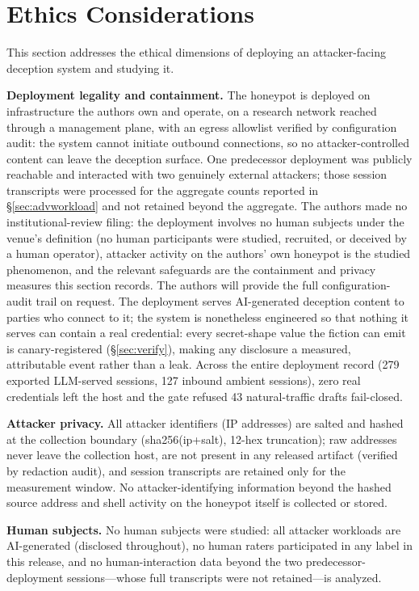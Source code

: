 \section{Ethics Considerations}
\label{sec:ethics}

This section addresses the ethical dimensions of deploying an
attacker-facing deception system and studying it.

\textbf{Deployment legality and containment.} The honeypot is deployed on
infrastructure the authors own and operate, on a research network reached
through a management plane, with an egress allowlist verified by
configuration audit: the system cannot initiate outbound connections, so
no attacker-controlled content can leave the deception surface. One
predecessor deployment was publicly reachable and interacted with two
genuinely external attackers; those session transcripts were processed
for the aggregate counts reported in \S\ref{sec:advworkload} and not
retained beyond the aggregate. The authors made no institutional-review
filing: the deployment involves no human subjects under the
venue's definition (no human participants were studied, recruited, or
deceived by a human operator), attacker activity on the authors' own
honeypot is the studied phenomenon, and the relevant safeguards are the
containment and privacy measures this section records. The authors will
provide the full configuration-audit trail on request. The
deployment serves AI-generated deception content to parties who connect
to it; the system is nonetheless engineered so that nothing it serves can
contain a real credential: every secret-shape value the fiction can emit
is canary-registered (\S\ref{sec:verify}), making any disclosure a
measured, attributable event rather than a leak. Across the entire
deployment record (279 exported LLM-served sessions, 127 inbound ambient
sessions), zero real credentials left the host and the gate refused 43
natural-traffic drafts fail-closed.

\textbf{Attacker privacy.} All attacker identifiers (IP addresses) are
salted and hashed at the collection boundary (sha256(ip+salt), 12-hex
truncation); raw addresses never leave the collection host, are not
present in any released artifact (verified by redaction audit), and
session transcripts are retained only for the measurement window. No
attacker-identifying information beyond the hashed source address and
shell activity on the honeypot itself is collected or stored.

\textbf{Human subjects.} No human subjects were studied: all attacker
workloads are AI-generated (disclosed throughout), no human raters
participated in any label in this release, and no human-interaction data
beyond the two predecessor-deployment sessions---whose full transcripts
were not retained---is analyzed.

